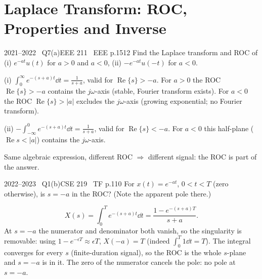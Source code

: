 \renewcommand{\teacherTag}{ASHRAF SIR \textbullet\ LAPLACE TRANSFORM}
\chapter{Laplace Transform: ROC, Properties and Inverse}


\begin{qcard}{2021--2022 \textbullet\ Q7(a)}{EEE 211 \textbullet\ EEE p.15}{12}
Find the Laplace transform and ROC of (i) $e^{-at}u(t)$ for $a>0$ and $a<0$, (ii) $-e^{-at}u(-t)$ for $a<0$.
\end{qcard}
\begin{solution}
(i) $\displaystyle\int_0^\infty e^{-(s+a)t}\dd t=\frac1{s+a}$, valid for $\operatorname{Re}\{s\}>-a$.
 For $a>0$ the ROC $\operatorname{Re}\{s\}>-a$ contains the $j\omega$-axis (stable, Fourier transform exists). For $a<0$ the ROC $\operatorname{Re}\{s\}>|a|$ excludes the $j\omega$-axis (growing exponential; no Fourier transform).

(ii) $-\displaystyle\int_{-\infty}^0e^{-(s+a)t}\dd t=\frac1{s+a}$, valid for $\operatorname{Re}\{s\}<-a$. For $a<0$ this half-plane ($\operatorname{Re}s<|a|$) contains the $j\omega$-axis.

Same algebraic expression, different ROC $\Rightarrow$ different signal: the ROC is part of the answer.
\end{solution}

\begin{qcard}{2022--2023 \textbullet\ Q1(b)}{CSE 219 \textbullet\ TF p.1}{10}
For $x(t)=e^{-at}$, $0<t<T$ (zero otherwise), is $s=-a$ in the ROC? (Note the apparent pole there.)
\end{qcard}
\begin{solution}
\[X(s)=\int_0^Te^{-(s+a)t}\dd t=\frac{1-e^{-(s+a)T}}{s+a}.\]
At $s=-a$ the numerator and denominator both vanish, so the singularity is removable: using $1-e^{-\epsilon T}\approx\epsilon T$, $X(-a)=T$ (indeed $\int_0^T1\dd t=T$). The integral converges for every $s$ (finite-duration signal), so the ROC is the whole $s$-plane and $s=-a$ is in it. The zero of the numerator cancels the pole: no pole at $s=-a$.
\end{solution}

